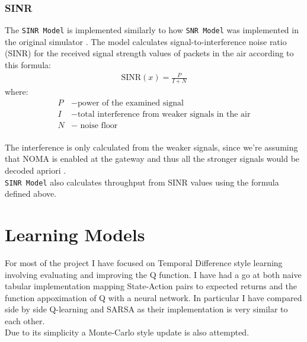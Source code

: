\subsubsection{SINR}
The \texttt{SINR Model} is implemented similarly to how \texttt{SNR Model} was implemented in the original simulator \cite{simulator}. The model calculates signal-to-interference noise ratio (SINR) for the received signal strength values of packets in the air according to this formula:
\begin{align}
    \text{SINR}(x) = \frac{P}{I + N} \label{eq:sinr}
\end{align}
where:
\begin{align*}
     P &- \text{power of the examined signal}\\
     I &- \text{total interference from weaker signals in the air}\\
     N &- \text{ noise floor}\\
\end{align*}

The interference is only calculated from the weaker signals, since we're assuming that NOMA is enabled at 
the gateway and thus all the stronger signals would be
decoded apriori \cite{noma_original}.\\

\texttt{SINR Model} also calculates throughput from SINR values using the formula defined above.

\section{Learning Models}

For most of the project I have focused on Temporal Difference
style learning involving evaluating and improving the Q
function. I have had a go at both naive tabular implementation
mapping State-Action pairs to expected returns and the 
function appoximation of Q with a neural network. 
In particular I have compared side by side Q-learning and SARSA
as their implementation is very similar to each other. \\

Due to its simplicity a Monte-Carlo style update is also 
attempted.
 
